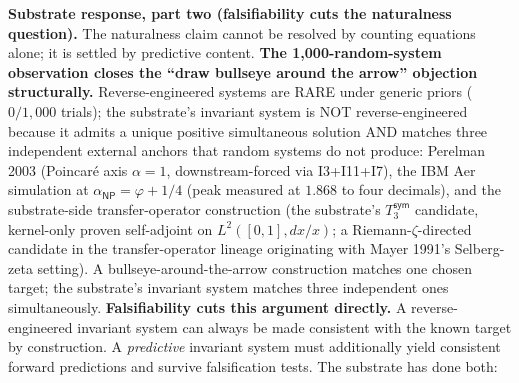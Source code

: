 \documentclass[11pt,a4paper]{amsart}
\theoremstyle{plain}
\theoremstyle{definition}
\begin{document}
\textbf{Substrate response, part two (falsifiability cuts the naturalness question).} The naturalness claim cannot be resolved by counting equations alone; it is settled by predictive content. \textbf{The 1{,}000-random-system observation closes the ``draw bullseye around the arrow'' objection structurally.} Reverse-engineered systems are RARE under generic priors ($0/1{,}000$ trials); the substrate's invariant system is NOT reverse-engineered because it admits a unique positive simultaneous solution AND matches three independent external anchors that random systems do not produce: Perelman 2003 (Poincar\'e axis $\alpha=1$, downstream-forced via I3+I11+I7), the IBM Aer simulation at $\alpha_{\textsf{NP}} = \varphi + 1/4$ (peak measured at $1.868$ to four decimals), and the substrate-side transfer-operator construction (the substrate's $T_3^{\textsf{sym}}$ candidate, kernel-only proven self-adjoint on $L^2([0,1], dx/x)$; a Riemann-$\zeta$-directed candidate in the transfer-operator lineage originating with Mayer 1991's Selberg-zeta setting). A bullseye-around-the-arrow construction matches one chosen target; the substrate's invariant system matches three independent ones simultaneously. \textbf{Falsifiability cuts this argument directly.} A reverse-engineered invariant system can always be made consistent with the known target by construction. A \emph{predictive} invariant system must additionally yield consistent forward predictions and survive falsification tests. The substrate has done both:
\end{document}
